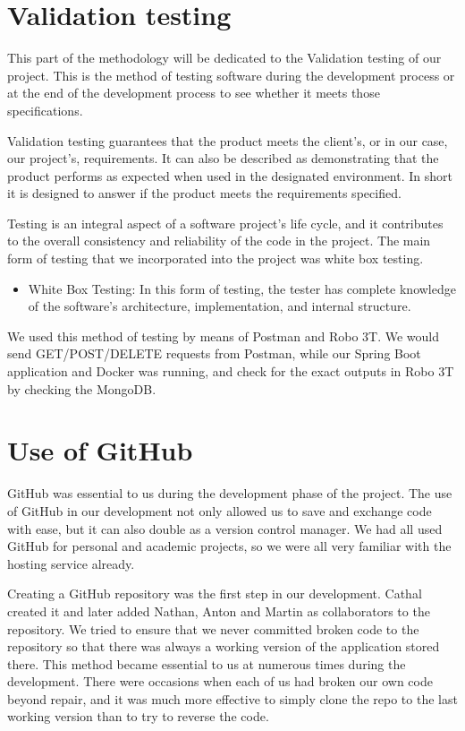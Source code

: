 \section{Validation testing}
This part of the methodology will be dedicated to the Validation testing of our project. This is the method of testing software during the development process or at the end of the development process to see whether it meets those specifications. \par
Validation testing guarantees that the product meets the client's, or in our case, our project's, requirements. It can also be described as demonstrating that the product performs as expected when used in the designated environment. In short it is designed to answer if the product meets the requirements specified.\par
Testing is an integral aspect of a software project's life cycle, and it contributes to the overall consistency and reliability of the code in the project. The main form of testing that we incorporated into the project was white box testing. 
\begin{itemize}
    \item White Box Testing: In this form of testing, the tester has complete knowledge of the software's architecture, implementation, and internal structure. 
\end{itemize}
\par We used this method of testing by means of Postman and Robo 3T. We would send GET/POST/DELETE requests from Postman, while our Spring Boot application and Docker was running, and check for the exact outputs in Robo 3T by checking the MongoDB.

\section{Use of GitHub}
GitHub was essential to us during the development phase of the project. The use of GitHub in our development not only allowed us to save and exchange code with ease, but it can also double as a version control manager. We had all used GitHub for personal and academic projects, so we were all very familiar with the hosting service already. \par
Creating a GitHub repository was the first step in our development. Cathal created it and later added Nathan, Anton and Martin as collaborators to the repository. We tried to ensure that we never committed broken code to the repository so that there was always a working version of the application stored there. This method became essential to us at numerous times during the development. There were occasions when each of us had broken our own code beyond repair, and it was much more effective to simply clone the repo to the last working version than to try to reverse the code. 

